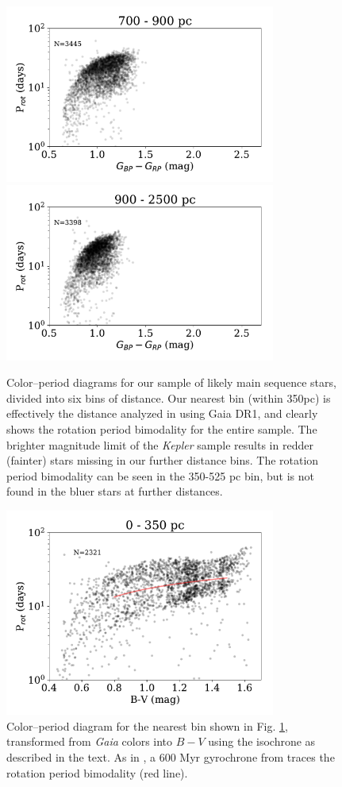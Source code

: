 \documentclass[trackchanges,preprint2]{aastex62}
\newcommand{\Kepler}{\textsl{Kepler}\xspace}
\begin{document}
\begin{figure}[]
\includegraphics[width=3.5in]{fig2e}
\includegraphics[width=3.5in]{fig2f}
\caption{Color--period diagrams for our sample of likely main sequence stars, divided into six bins of distance. Our nearest bin (within 350pc) is effectively the distance analyzed in \citet{davenport2017} using Gaia DR1, and clearly shows the rotation period bimodality for the entire sample. The brighter magnitude limit of the \Kepler sample results in redder (fainter) stars missing in our further distance bins. The rotation period bimodality can be seen in the 350-525 pc bin, but is not found in the bluer stars at further distances.
}
\label{fig:color_period}
\end{figure}




\begin{figure}[!ht]
\centering
\includegraphics[width=3.5in]{fig3}
\caption{Color--period diagram for the nearest bin shown in Fig. \ref{fig:color_period}, transformed from {\em Gaia} colors into $B-V$ using the isochrone as described in the text. As in \citet{davenport2017}, a 600 Myr gyrochrone from \citet{meibom2009} traces the rotation period bimodality (red line).}
\label{fig:BV_gyro}
\end{figure}
\end{document}
